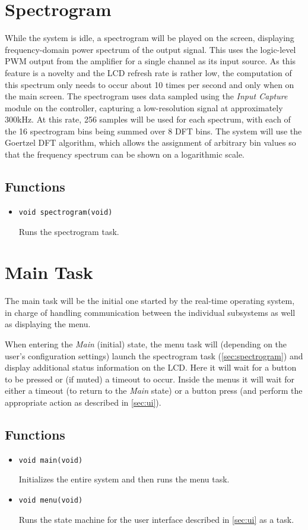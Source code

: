 \section{Spectrogram}
\label{sec:spectrogram}
While the system is idle, a spectrogram will be played on the screen, displaying frequency-domain power spectrum of the output signal. This uses the logic-level PWM output from the amplifier for a single channel as its input source. As this feature is a novelty and the LCD refresh rate is rather low, the computation of this spectrum only needs to occur about 10 times per second and only when on the main screen. The spectrogram uses data sampled using the \emph{Input Capture} module on the controller, capturing a low-resolution signal at approximately 300kHz. At this rate, 256 samples will be used for each spectrum, with each of the 16 spectrogram bins being summed over 8 DFT bins. The system will use the Goertzel DFT algorithm, which allows the assignment of arbitrary bin values so that the frequency spectrum can be shown on a logarithmic scale.  

\subsection*{Functions}
\begin{itemize}
\item \verb|void spectrogram(void)|

Runs the spectrogram task.
\end{itemize}

\section{Main Task}

The main task will be the initial one started by the real-time operating system, in charge of handling communication between the individual subsystems as well as displaying the menu.

When entering the \emph{Main} (initial) state, the menu task will (depending on the user's configuration settings) launch the spectrogram task (\autoref{sec:spectrogram}) and display additional status information on the LCD. Here it will wait for a button to be pressed or (if muted) a timeout to occur. Inside the menus it will wait for either a timeout (to return to the \emph{Main} state) or a button press (and perform the appropriate action as described in \autoref{sec:ui}).

\subsection*{Functions}
\begin{itemize}
\item \verb|void main(void)|

Initializes the entire system and then runs the menu task.

\item \verb|void menu(void)|

Runs the state machine for the user interface described in \autoref{sec:ui} as a task.
\end{itemize}
